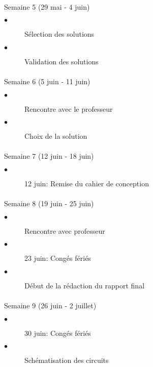 		\paragraph{}
		Semaine 5 (29 mai - 4 juin)
			\begin{description}
				\item[$\bullet$] Sélection des solutions	
				\item[$\bullet$] Validation des solutions
			\end{description}
		
			
		\paragraph{}
		Semaine 6 (5 juin - 11 juin)
			\begin{description}
				\item[$\bullet$] Rencontre avec le professeur
				\item[$\bullet$] Choix de la solution			
				
    			    
			\end{description}		
		
		\paragraph{}
		Semaine 7 (12 juin - 18 juin)
			\begin{description}
				\item[$\bullet$] 12 juin: Remise du cahier de conception
			\end{description}
		
		\paragraph{}
		Semaine 8 (19 juin - 25 juin)
			\begin{description}
				\item[$\bullet$] Rencontre avec professeur
				\item[$\bullet$] 23 juin: Congés fériés
				\item[$\bullet$] Début de la rédaction du rapport final
				
			\end{description}
		
		\paragraph{}
		Semaine 9 (26 juin - 2 juillet)
			\begin{description}
				\item[$\bullet$] 30 juin: Congés fériés
				\item[$\bullet$] Schématisation	des circuits		
		\end{description}


